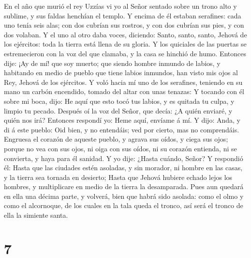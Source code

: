  En el año que murió el rey Uzzías vi yo al Señor sentado
sobre un trono alto y sublime, y sus faldas henchían el templo.
 Y encima de él estaban serafines: cada uno tenía seis
alas; con dos cubrían sus rostros, y con dos cubrían sus pies, y con dos
volaban.  Y el uno al otro daba voces, diciendo: Santo,
santo, santo, Jehová de los ejércitos: toda la tierra está llena de su
gloria.  Y los quiciales de las puertas se estremecieron
con la voz del que clamaba, y la casa se hinchió de humo. 
Entonces dije: ¡Ay de mí! que soy muerto; que siendo hombre inmundo de
labios, y habitando en medio de pueblo que tiene labios inmundos, han
visto mis ojos al Rey, Jehová de los ejércitos.  Y voló
hacia mí uno de los serafines, teniendo en su mano un carbón encendido,
tomado del altar con unas tenazas:  Y tocando con él sobre
mi boca, dijo: He aquí que esto tocó tus labios, y es quitada tu culpa,
y limpio tu pecado.  Después oí la voz del Señor, que
decía: ¿A quién enviaré, y quién nos irá? Entonces respondí yo: Heme
aquí, envíame á mí.  Y dijo: Anda, y di á este pueblo: Oid
bien, y no entendáis; ved por cierto, mas no comprendáis.
 Engruesa el corazón de aqueste pueblo, y agrava sus
oídos, y ciega sus ojos; porque no vea con sus ojos, ni oiga con sus
oídos, ni su corazón entienda, ni se convierta, y haya para él sanidad.
 Y yo dije: ¿Hasta cuándo, Señor? Y respondió él: Hasta
que las ciudades estén asoladas, y sin morador, ni hombre en las casas,
y la tierra sea tornada en desierto;  Hasta que Jehová
hubiere echado lejos los hombres, y multiplicare en medio de la tierra
la desamparada.  Pues aun quedará en ella una décima
parte, y volverá, bien que habrá sido asolada: como el olmo y como el
alcornoque, de los cuales en la tala queda el tronco, así será el tronco
de ella la simiente santa.

\hypertarget{section-6}{%
\section{7}\label{section-6}}

